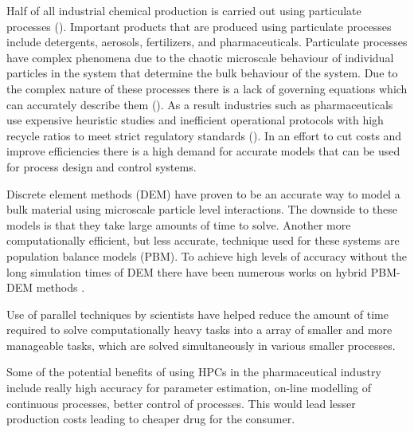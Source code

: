 \documentclass[preprint,11pt,authoryear]{elsarticle}
\begin{document}
	\par Half of all industrial chemical production is carried out using particulate processes (\cite{seville1997}). Important products that are produced using particulate processes include detergents, aerosols, fertilizers, and pharmaceuticals. Particulate processes have complex phenomena due to the chaotic microscale behaviour of individual particles in the system that determine the bulk behaviour of the system. Due to the complex nature of these processes there is a lack of governing equations which can accurately describe them (\cite{sen2013}). As a result industries such as pharmaceuticals use expensive heuristic studies and inefficient operational protocols with high recycle ratios to meet strict regulatory standards (\cite{Ramachandran2009}). In an effort to cut costs and improve efficiencies there is a high demand for accurate models that can be used for process design and control systems.   
	\par Discrete element methods (DEM) have proven to be an accurate way to model a bulk material using microscale particle level interactions. The downside to these models is that they take large amounts of time to solve. Another more computationally efficient, but less accurate, technique used for these systems are population balance models (PBM). To achieve high levels of accuracy without the long simulation times of DEM there have been numerous works on hybrid PBM-DEM methods \citep{Barrasso2015cerd}.
	\par Use of parallel techniques by scientists have helped reduce the amount of time required to solve computationally heavy tasks into a array of smaller and more manageable tasks, which are solved simultaneously in various smaller processes. 
	\par Some of the potential benefits of using HPCs in the pharmaceutical industry include really high accuracy for parameter estimation, on-line modelling of continuous processes, better control of processes. This would lead lesser production costs leading to cheaper drug for the consumer.
	
\end{document}
